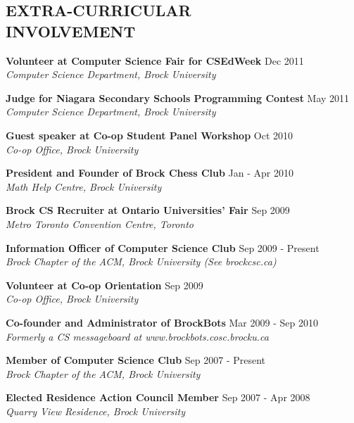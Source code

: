 \documentclass[margin]{res}
\begin{document}
\begin{resume}
\section{EXTRA-CURRICULAR \\ INVOLVEMENT}

  \textbf{Volunteer at Computer Science Fair for CSEdWeek} \hfill Dec 2011 \\
    {\sl Computer Science Department, Brock University}

  \textbf{Judge for Niagara Secondary Schools Programming Contest} \hfill May 2011 \\
    {\sl Computer Science Department, Brock University}

  \textbf{Guest speaker at Co-op Student Panel Workshop} \hfill Oct 2010 \\
    {\sl Co-op Office, Brock University}

  \textbf{President and Founder of Brock Chess Club} \hfill Jan - Apr 2010 \\
    {\sl Math Help Centre, Brock University}

  \textbf{Brock CS Recruiter at Ontario Universities' Fair} \hfill Sep 2009 \\
    {\sl Metro Toronto Convention Centre, Toronto}

  \textbf{Information Officer of Computer Science Club} \hfill Sep 2009 - Present \\
    {\sl Brock Chapter of the ACM, Brock University (See brockcsc.ca)}

  \textbf{Volunteer at Co-op Orientation} \hfill Sep 2009 \\
    {\sl Co-op Office, Brock University}

  \textbf{Co-founder and Administrator of BrockBots} \hfill Mar 2009 - Sep 2010 \\
    {\sl Formerly a CS messageboard at www.brockbots.cosc.brocku.ca}
    
  \textbf{Member of Computer Science Club} \hfill Sep 2007 - Present \\
    {\sl Brock Chapter of the ACM, Brock University}

  \textbf{Elected Residence Action Council Member} \hfill Sep 2007 - Apr 2008 \\
    {\sl Quarry View Residence, Brock University}

 

\end{resume}
\end{document}
